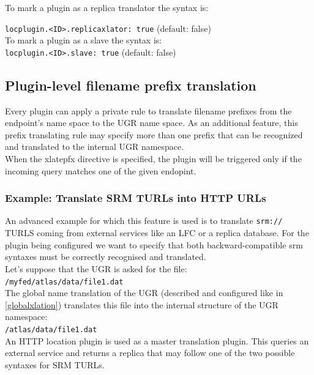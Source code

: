 \documentclass[12pt]{article} %
\begin{document}
To mark a plugin as a replica translator the syntax is:

\lstinline"locplugin.<ID>.replicaxlator: true" (default: false)\\

To mark a plugin as a slave the syntax is:\\

\lstinline"locplugin.<ID>.slave: true" (default: false)\\




\subsection{Plugin-level filename prefix translation}

Every plugin can apply a private rule to translate filename prefixes from the endpoint's name space to the UGR name space. As an additional feature, this prefix translating rule may specify more than one prefix that can be recognized and translated to the internal UGR namespace.\\

When the xlatepfx directive is specified, the plugin will be triggered only if the incoming query matches one of the given endopint.

\subsubsection{Example: Translate SRM TURLs into HTTP URLs}
An advanced example for which this feature is used is to translate \lstinline"srm://" TURLS coming from external services like an LFC or a replica database. For the plugin being configured we want to specify that both backward-compatible srm syntaxes must be correctly recognised and translated.\\

Let's suppose that the UGR is asked for the file:\\

\lstinline"/myfed/atlas/data/file1.dat" \\

The global name translation of the UGR (described and configured like in \ref{globalxlation}) translates this file into the internal structure of the UGR namespace:\\

\lstinline"/atlas/data/file1.dat"\\

An HTTP location plugin is used as a master translation plugin. This queries an external service and returns a replica that may follow one of the two possible syntaxes for SRM TURLs.\\
\end{document}

